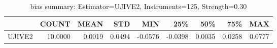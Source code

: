 \begin{table}[ht]
\centering
\caption{bias summary: Estimator=UJIVE2, Instruments=125, Strength=0.30}
\begin{tabular}{lrrrrrrrr}
\toprule
 & COUNT & MEAN & STD & MIN & 25\% & 50\% & 75\% & MAX \\
\midrule
UJIVE2 & 10.0000 & 0.0019 & 0.0494 & -0.0576 & -0.0398 & 0.0035 & 0.0258 & 0.0777 \\
\bottomrule
\end{tabular}
\end{table}
